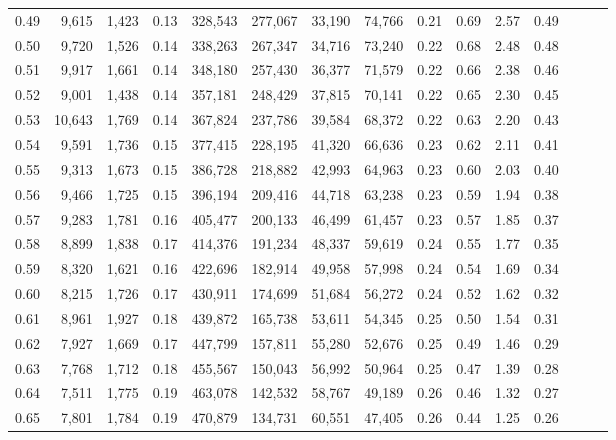 \begin{tabular}{rrrrrrrrrrrrrrr}
0.49 &   9,615 &  1,423 &  0.13 &  328,543 &  277,067 &   33,190 &   74,766 &  0.21 &  0.69 &  2.57 &      0.49 \\
0.50 &   9,720 &  1,526 &  0.14 &  338,263 &  267,347 &   34,716 &   73,240 &  0.22 &  0.68 &  2.48 &      0.48 \\
0.51 &   9,917 &  1,661 &  0.14 &  348,180 &  257,430 &   36,377 &   71,579 &  0.22 &  0.66 &  2.38 &      0.46 \\
0.52 &   9,001 &  1,438 &  0.14 &  357,181 &  248,429 &   37,815 &   70,141 &  0.22 &  0.65 &  2.30 &      0.45 \\
0.53 &  10,643 &  1,769 &  0.14 &  367,824 &  237,786 &   39,584 &   68,372 &  0.22 &  0.63 &  2.20 &      0.43 \\
0.54 &   9,591 &  1,736 &  0.15 &  377,415 &  228,195 &   41,320 &   66,636 &  0.23 &  0.62 &  2.11 &      0.41 \\
0.55 &   9,313 &  1,673 &  0.15 &  386,728 &  218,882 &   42,993 &   64,963 &  0.23 &  0.60 &  2.03 &      0.40 \\
0.56 &   9,466 &  1,725 &  0.15 &  396,194 &  209,416 &   44,718 &   63,238 &  0.23 &  0.59 &  1.94 &      0.38 \\
0.57 &   9,283 &  1,781 &  0.16 &  405,477 &  200,133 &   46,499 &   61,457 &  0.23 &  0.57 &  1.85 &      0.37 \\
0.58 &   8,899 &  1,838 &  0.17 &  414,376 &  191,234 &   48,337 &   59,619 &  0.24 &  0.55 &  1.77 &      0.35 \\
0.59 &   8,320 &  1,621 &  0.16 &  422,696 &  182,914 &   49,958 &   57,998 &  0.24 &  0.54 &  1.69 &      0.34 \\
0.60 &   8,215 &  1,726 &  0.17 &  430,911 &  174,699 &   51,684 &   56,272 &  0.24 &  0.52 &  1.62 &      0.32 \\
0.61 &   8,961 &  1,927 &  0.18 &  439,872 &  165,738 &   53,611 &   54,345 &  0.25 &  0.50 &  1.54 &      0.31 \\
0.62 &   7,927 &  1,669 &  0.17 &  447,799 &  157,811 &   55,280 &   52,676 &  0.25 &  0.49 &  1.46 &      0.29 \\
0.63 &   7,768 &  1,712 &  0.18 &  455,567 &  150,043 &   56,992 &   50,964 &  0.25 &  0.47 &  1.39 &      0.28 \\
0.64 &   7,511 &  1,775 &  0.19 &  463,078 &  142,532 &   58,767 &   49,189 &  0.26 &  0.46 &  1.32 &      0.27 \\
0.65 &   7,801 &  1,784 &  0.19 &  470,879 &  134,731 &   60,551 &   47,405 &  0.26 &  0.44 &  1.25 &      0.26 \\

\end{tabular}
